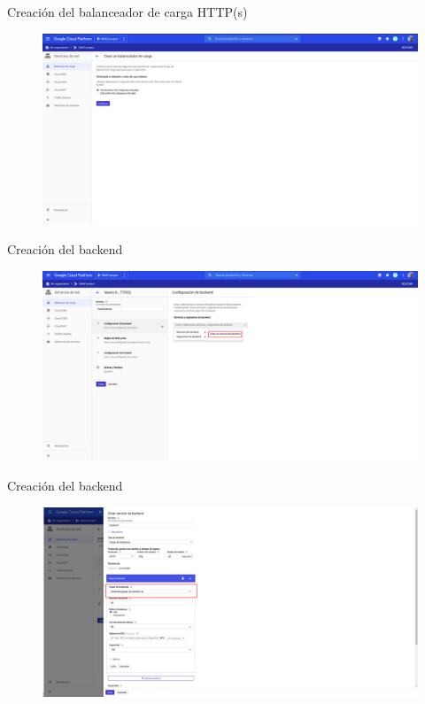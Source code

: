 \documentclass{beamer}
\begin{document}
\begin{frame}[fragile]{Creación del balanceador de carga HTTP(s)}
  \begin{figure}[H]
		\centering
		\includegraphics[width=\textwidth]{project/frominternet.png}
	\end{figure}
\end{frame}

\begin{frame}[fragile]{Creación del backend}
  \begin{figure}[H]
		\centering
		\includegraphics[width=\textwidth]{project/backend.png}
	\end{figure}
\end{frame}

\begin{frame}[fragile]{Creación del backend}
  \begin{figure}[H]
		\centering
		\includegraphics[width=\textwidth]{project/backend_selection.png}
	\end{figure}
\end{frame}
\end{document}

